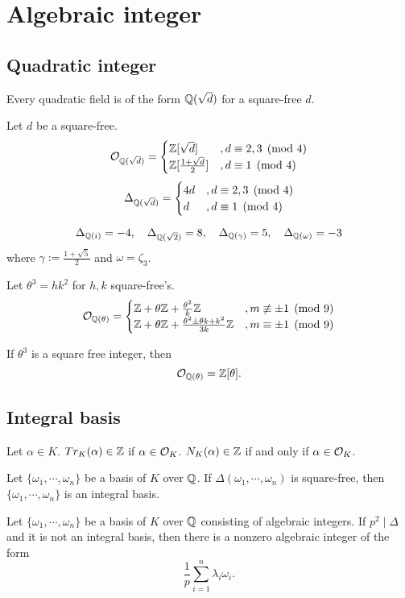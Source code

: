 \documentclass[a4paper]{article}
\begin{document}
\section{Algebraic integer}
\subsection{Quadratic integer}
\begin{thm}
Every quadratic field is of the form $\mathbb{Q}(\sqrt d)$ for a square-free $d$.
\end{thm}
\begin{thm}
Let $d$ be a square-free.
\[\mathcal{O}_{\mathbb{Q}(\sqrt d)}=\begin{cases}\mathbb{Z}[\sqrt d]&,d\equiv2,3\pmod4\\\mathbb{Z}[\tfrac{1+\sqrt d}2]&,d\equiv1\pmod4\end{cases}\]
\[\Delta_{\mathbb{Q}(\sqrt d)}=\begin{cases}4d&,d\equiv2,3\pmod4\\ d&,d\equiv1\pmod4\end{cases}\]
\end{thm}
\begin{ex}
\[\Delta_{\mathbb{Q}(i)}=-4,\quad\Delta_{\mathbb{Q}(\sqrt2)}=8,\quad\Delta_{\mathbb{Q}(\gamma)}=5,\quad\Delta_{\mathbb{Q}(\omega)}=-3\]
where $\gamma:=\frac{1+\sqrt5}2$ and $\omega=\zeta_3$.
\end{ex}
\begin{thm}
Let $\theta^3=hk^2$ for $h,k$ square-free's.
\[\mathcal{O}_{\mathbb{Q}(\theta)}=\begin{cases}\mathbb{Z}+\theta\mathbb{Z}+\frac{\theta^2}k\mathbb{Z}&,m\not\equiv\pm1\pmod9\\
\mathbb{Z}+\theta\mathbb{Z}+\frac{\theta^2\pm\theta k+k^2}{3k}\mathbb{Z}&,m\equiv\pm1\pmod9\end{cases}\]
\end{thm}
\begin{cor}
If $\theta^3$ is a square free integer, then
\[\mathcal{O}_{\mathbb{Q}(\theta)}=\mathbb{Z}[\theta].\]
\end{cor}

\subsection{Integral basis}
\begin{thm}
Let $\alpha\in K$.
$Tr_K(\alpha)\in\mathbb{Z}$ if $\alpha\in\mathcal{O}_K$.
$N_K(\alpha)\in\mathbb{Z}$ if and only if $\alpha\in\mathcal{O}_K$.
\end{thm}
\begin{thm}
Let $\{\omega_1,\cdots,\omega_n\}$ be a basis of $K$ over $\mathbb{Q}$.
If $\Delta(\omega_1,\cdots,\omega_n)$ is square-free, then $\{\omega_1,\cdots,\omega_n\}$ is an integral basis.
\end{thm}
\begin{thm}
Let $\{\omega_1,\cdots,\omega_n\}$ be a basis of $K$ over $\mathbb{Q}$ consisting of algebraic integers.
If $p^2\mid\Delta$ and it is not an integral basis, then there is a nonzero algebraic integer of the form
\[\frac1p\sum_{i=1}^n\lambda_i\omega_i.\]
\end{thm}
\end{document}

